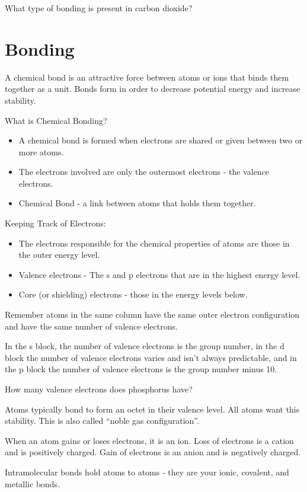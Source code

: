 \documentclass[../hchem.tex]{subfiles}
\begin{document}
\ex What type of bonding is present in carbon dioxide?

\section{Bonding}
A chemical bond is an attractive force between atoms or ions that binds them together as a unit. Bonds form in order to decrease potential energy and increase stability.

What is Chemical Bonding?
\begin{itemize}
    \item A chemical bond is formed when electrons are shared or given between two or more atoms.
    \item The electrons involved are only the outermost electrons - the valence electrons.
    \item Chemical Bond - a link between atoms that holds them together.
\end{itemize}

Keeping Track of Electrons:
\begin{itemize}
    \item The electrons responsible for the chemical properties of atoms are those in the outer energy level.
    \item Valence electrons - The s and p electrons that are in the highest energy level.
    \item Core (or shielding) electrons - those in the energy levels below.
\end{itemize}

Remember atoms in the same column have the same outer electron configuration and have the same number of valence electrons.

In the s block, the number of valence electrons is the group number, in the d block the number of valence electrons 
varies and isn't always predictable, and in the p block the number of valence electrons is the group number minus 10.

\ex How many valence electrons does phosphorus have?

Atoms typically bond to form an octet in their valence level. All atoms want this stability. This is also called ``noble gas configuration''.

When an atom gains or loses electrons, it is an ion. Loss of electrons is a cation and is positively charged. Gain of electrons is an anion and is negatively charged.

Intramolecular bonds hold atoms to atoms - they are your ionic, covalent, and metallic bonds.
\end{document}
